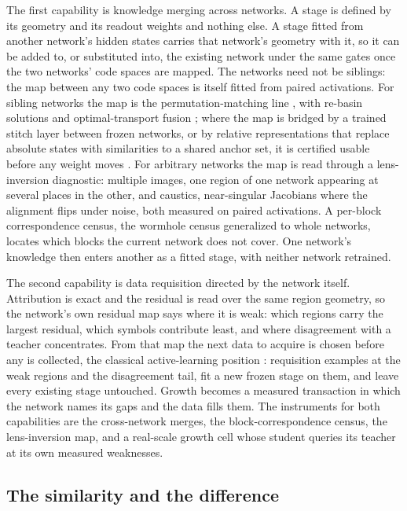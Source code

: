 \documentclass[11pt]{article}
\begin{document}
The first capability is knowledge merging across networks. A stage
is defined by its geometry and its readout weights and nothing
else. A stage fitted from another network's hidden states carries
that network's geometry with it, so it can be added to, or
substituted into, the existing network under the same gates once
the two networks' code spaces are mapped. The networks need not be
siblings: the map between any two code spaces is itself fitted from
paired activations. For sibling networks the map is the
permutation-matching line \cite{entezari2021}, with re-basin
solutions \cite{ainsworth2023} and optimal-transport fusion
\cite{singh2020}; where the map is bridged by a trained stitch
layer between frozen networks, or by relative representations that
replace absolute states with similarities to a shared anchor set,
it is certified usable before any weight moves
\cite{stitch2026,moschella2022,relgeom2024}. For arbitrary networks
the map is read through a lens-inversion diagnostic: multiple
images, one region of one
network appearing at several places in the other, and caustics,
near-singular Jacobians where the alignment flips under noise, both
measured on paired activations. A per-block correspondence census,
the wormhole census generalized to whole networks, locates which
blocks the current network does not cover. One network's knowledge
then enters another as a fitted stage, with neither network
retrained.

The second capability is data requisition directed by the network
itself. Attribution is exact and the residual is read over the
same region geometry, so the network's own residual map says where
it is weak: which regions carry the largest residual, which symbols
contribute least, and where disagreement with a teacher
concentrates. From that map the next data to acquire is chosen
before any is collected, the classical active-learning position
\cite{settles2009}: requisition examples at the weak regions and
the disagreement tail, fit a new frozen stage on them, and leave
every existing stage untouched. Growth becomes a measured
transaction in which the network names its gaps and the data fills
them. The instruments for both capabilities are the cross-network
merges, the block-correspondence census, the lens-inversion map,
and a real-scale growth cell whose student queries its teacher at
its own measured weaknesses.

\subsection{The similarity and the difference}
\end{document}
